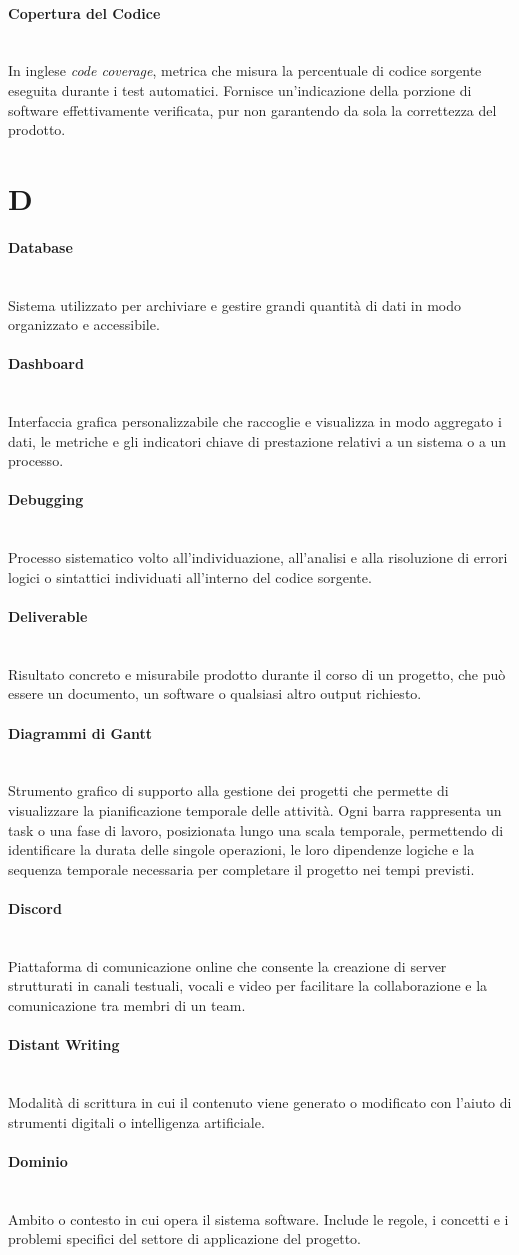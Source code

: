 \documentclass[a4paper, 10pt, colorlinks=true, linkcolor=black, urlcolor=blue, citecolor=blue, hidelinks]{article}
\newcommand{\glossaryterm}[2]{
    \paragraph{#1 \label{term:#1}} \mbox{} \\
    #2
    \vspace{0.5em}
}
\begin{document}
\glossaryterm{Copertura del Codice}{In inglese \textit{code coverage}, metrica che misura la percentuale di codice sorgente eseguita durante i test automatici. Fornisce un'indicazione della porzione di software effettivamente verificata, pur non garantendo da sola la correttezza del prodotto.}

\newpage

\section*{D}

\glossaryterm{Database}{Sistema utilizzato per archiviare e gestire grandi quantità di dati in modo organizzato e accessibile.}

\glossaryterm{Dashboard}{Interfaccia grafica personalizzabile che raccoglie e visualizza in modo aggregato i dati, le metriche e gli indicatori chiave di prestazione relativi a un sistema o a un processo.}

\glossaryterm{Debugging}{Processo sistematico volto all'individuazione, all'analisi e alla risoluzione di errori logici o sintattici individuati all'interno del codice sorgente.}

\glossaryterm{Deliverable}{Risultato concreto e misurabile prodotto durante il corso di un progetto, che può essere un documento, un software o qualsiasi altro output richiesto.}

\glossaryterm{Diagrammi di Gantt}{Strumento grafico di supporto alla gestione dei progetti che permette di visualizzare la pianificazione temporale delle attività. Ogni barra rappresenta un task o una fase di lavoro, posizionata lungo una scala temporale, permettendo di identificare la durata delle singole operazioni, le loro dipendenze logiche e la sequenza temporale necessaria per completare il progetto nei tempi previsti.}

\glossaryterm{Discord}{Piattaforma di comunicazione online che consente la creazione di server strutturati in canali testuali, vocali e video per facilitare la collaborazione e la comunicazione tra membri di un team.}

\glossaryterm{Distant Writing}{Modalità di scrittura in cui il contenuto viene generato o modificato con l'aiuto di strumenti digitali o intelligenza artificiale.}

\glossaryterm{Dominio}{Ambito o contesto in cui opera il sistema software. Include le regole, i concetti e i problemi specifici del settore di applicazione del progetto.}
\end{document}
